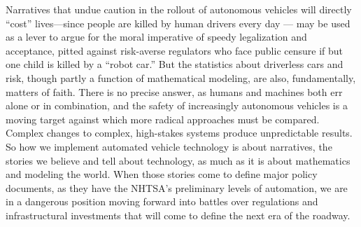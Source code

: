 
Narratives that undue caution in the
rollout of autonomous vehicles will directly ``cost'' lives---since
people are killed by human drivers every day \cite{driverlessfuture}
\cite{baileyReason} \cite{howardRobots}---
may be used as a lever to argue for the moral imperative of
speedy legalization and acceptance, pitted against risk-averse regulators who face
public censure if but one child is killed by a
``robot car.'' But the statistics about driverless
cars and risk, though partly a function of mathematical modeling, are
also, fundamentally, matters of faith. There is no precise answer, as
humans and machines both err alone or in combination, and
the safety of increasingly autonomous vehicles is a moving target
against which more radical approaches must be compared.
Complex changes to complex, high-stakes systems produce unpredictable
results. So how we implement automated vehicle technology is
about narratives, the stories we believe and tell about technology, as
much as it is about mathematics and modeling the world. When those
stories come to define major policy documents, as they have the
NHTSA's preliminary levels of automation, we are in a dangerous
position moving forward into battles over regulations and
infrastructural investments that will come to define the next era of
the roadway.




